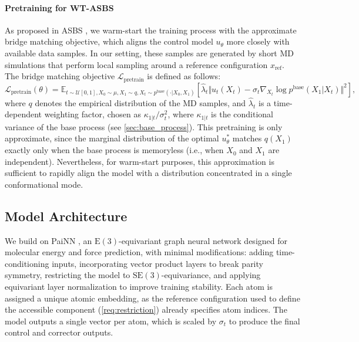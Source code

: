 \documentclass[]{fairmeta}
\theoremstyle{remark}
\begin{document}
\paragraph{Pretraining for WT-ASBS}
As proposed in ASBS \citep{liu2025adjoint}, we warm-start the training process with the approximate bridge matching objective, which aligns the control model $u_\theta$ more closely with available data samples.
In our setting, these samples are generated by short MD simulations that perform local sampling around a reference configuration $x_\text{ref}$.
The bridge matching objective $\mathcal{L}_\text{pretrain}$ is defined as follows:
\begin{equation}
\mathcal{L}_\text{pretrain}(\theta) = \mathbb{E}_{t \sim \mathcal{U}[0, 1], X_0 \sim \mu, X_1 \sim q, X_t\sim p^\text{base}(\cdot | X_0, X_1)} \left[ \hat{\lambda}_t \Vert u_t(X_t) - \sigma_t \nabla_{X_t} \log p^\text{base}(X_1 | X_t) \Vert^2 \right],
\end{equation}
where $q$ denotes the empirical distribution of the MD samples, and $\hat{\lambda}_t$ is a time-dependent weighting factor, chosen as $\kappa_{1|t} / \sigma_t^2$, where $\kappa_{1|t}$ is the conditional variance of the base process (see \cref{sec:base_process}).
This pretraining is only approximate, since the marginal distribution of the optimal $u_\theta^\ast$ matches $q(X_1)$ exactly only when the base process is memoryless (i.e., when $X_0$ and $X_1$ are independent).
Nevertheless, for warm-start purposes, this approximation is sufficient to rapidly align the model with a distribution concentrated in a single conformational mode.

\subsection{Model Architecture}
We build on PaiNN \citep{schutt2021equivariant}, an $\mathrm{E}(3)$-equivariant graph neural network designed for molecular energy and force prediction, with minimal modifications: adding time-conditioning inputs, incorporating vector product layers \citep{schreiner2024implicit} to break parity symmetry, restricting the model to $\mathrm{SE}(3)$-equivariance, and applying equivariant layer normalization \citep{liao2024equiformerv2} to improve training stability.
Each atom is assigned a unique atomic embedding, as the reference configuration used to define the accessible component (\cref{req:restriction}) already specifies atom indices.
The model outputs a single vector per atom, which is scaled by $\sigma_t$ to produce the final control and corrector outputs.
\end{document}
